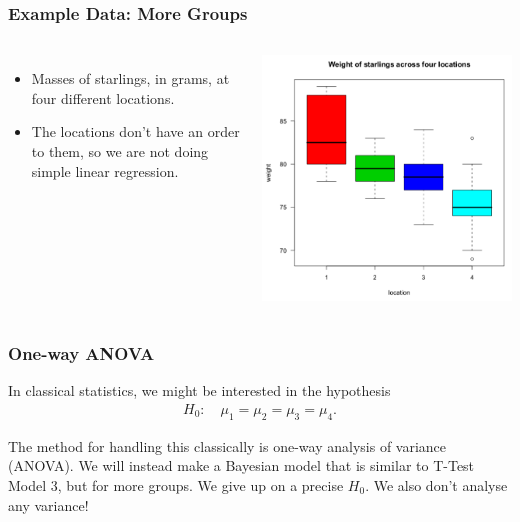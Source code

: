 \documentclass{beamer}
\begin{document}
\begin{frame}[fragile]
\frametitle{Example Data: More Groups}

\begin{columns} %
    \begin{itemize}
    \item Masses of starlings, in grams, at four different locations.
    \item The locations don't have an order to them, so we are not doing
          simple linear regression.
    \end{itemize}

    \includegraphics[width=1\linewidth]{images/starling.png}
 \end{columns}


\end{frame}

\begin{frame}[fragile]
\frametitle{One-way ANOVA}
In classical statistics, we might be interested in the hypothesis
\begin{align}
H_0:\quad \mu_1 = \mu_2 = \mu_3 = \mu_4.
\end{align}
\pause

The method for handling this classically is one-way analysis of variance
(ANOVA). We will instead make a Bayesian model that is similar to T-Test
Model 3, but for more groups. We give up on a precise $H_0$.
We also don't analyse any variance!

\end{frame}
\end{document}
